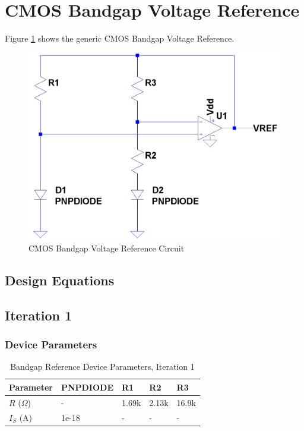 \documentclass[conference]{IEEEtran}
\begin{document}
\section{CMOS Bandgap Voltage Reference}
Figure \ref{fig:bgr-1} shows the generic CMOS Bandgap Voltage Reference. 

\begin{figure}[!htbp]
  	\centering
  	\includegraphics[scale=0.25]{images/bgr-1.png}
  	\caption[bgr-1]{CMOS Bandgap Voltage Reference Circuit}
  	\label{fig:bgr-1}
	\end{figure}

\subsection{Design Equations}

\subsection{Iteration 1}
	\subsubsection{Device Parameters}
\begin{table}[!htbp]
  \caption[]{Bandgap Reference Device Parameters, Iteration 1}
  \label{tab:bg-dp-1}
  \centering
  \begin{tabular}{|l|l|l|l|l|}
    \hline
    Parameter			& PNPDIODE	&R1 &R2	&R3 \\ \hline
    $R$ ($\Omega$)		&-			&1.69k	&2.13k	&16.9k\\ \hline
    $I_S$ (A)		&1e-18			&-	&-	&-\\
    \hline
  \end{tabular}
\end{table}
\end{document}
